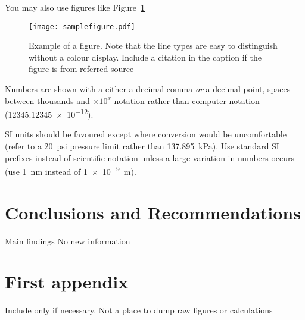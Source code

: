 \documentclass[a4paper,12pt]{article}
\begin{document}
You may also use figures like Figure~\ref{fig:samplefigure}

\begin{figure}[htbp]
  \centering
  \texttt{[image: samplefigure.pdf]}
  \caption[Short caption which will be in the table of figures]{Example of a figure.  Note that the line types are easy to
    distinguish without a colour display.  Include a citation in the caption if the figure is from referred source}
  \label{fig:samplefigure}
\end{figure}

Numbers are shown with a either a decimal comma \emph{or} a decimal point, spaces between thousands and $\times 10^x$ notation rather than computer notation (\num{12345.12345e-12}).

SI units should be favoured except where conversion would be
uncomfortable (refer to a \SI{20}{psi} pressure limit rather than
\SI{137.895}{\kilo\pascal}).
Use standard
SI prefixes instead of scientific notation unless a large variation in
numbers occurs (use \SI{1}{\nano\meter} instead of \SI{1e-9}{\meter}).

\section{Conclusions and Recommendations}
Main findings
No new information


\printbibliography
\appendix
\renewcommand{\thefigure}{\thesection.\arabic{figure}}
\renewcommand{\thepage}{\thesection.\arabic{page}}
\section{First appendix}
\setcounter{figure}{0}
\setcounter{page}{1}
Include only if necessary. Not a place to dump raw figures or calculations
\end{document}
